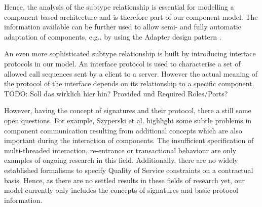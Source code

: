 Hence, the analysis of the subtype relationship is essential for modelling a component based architecture and is therefore part of our component model. The information available can be further used to allow semi- and fully automatic adaptation of components, e.g., by using the Adapter design pattern \cite{gamma1995a}.

An even more sophisticated subtype relationship is built by introducing interface protocols in our model. An interface protocol is used to characterise a set of allowed call sequences sent by a client to a server. However the actual meaning of the protocol of the interface depends on its relationship to a specific component. TODO: Soll das wirklich hier hin? Provided und Required Roles/Ports?

However, having the concept of signatures and their protocol, there a still some open questions. For example, Szyperski et al. \cite{szyperski2002a} highlight some subtle problems in component communication resulting from additional concepts which are also important during the interaction of components. The insufficient specification of multi-threaded interaction, re-entrance or transactional behaviour are only examples of ongoing research in this field. Additionally, there are no widely established formalisms to specify Quality of Service constraints on a contractual basis. Hence, as there are no settled results in these fields of research yet, our model currently only includes the concepts of signatures and basic protocol information.